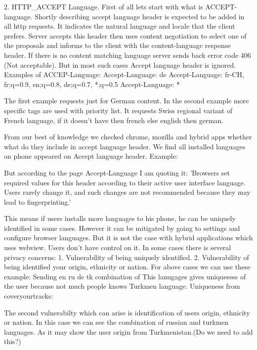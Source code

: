 2. HTTP\_ACCEPT Language.
First of all lets start with what is ACCEPT-language. 
Shortly describing accept language header is expected to be added in all http requests. It indicates the natural language and locale that the client prefers. Server accepts this header then uses content negotiation to select one of the proposals and informs to the client with the content-language response header. 
 If there is no content matching language server sends back error code 406 (Not acceptable). But in most such cases Accept language header is ignored. 
Examples of ACCEP-Language:
Accept-Language: de
Accept-Language: fr-CH, fr;q=0.9, en;q=0.8, de;q=0.7, *;q=0.5
Accept-Language: *


The first example requests just for German content. In the second example more specific   tags  are used with priority list. It requests Swiss regional variant of French language, if it doesn't have then french else  english then german. 

From our best of knowledge we checked chrome, mozilla and hybrid apps whether what do they include in accept language header. 
We find all installed languages on phone appeared on Accept language header. 
Example:

But according to the page Accept-Language I am quoting it: 
 'Browsers set required values for this header according to their active user interface language. Users rarely change it, and such changes are not recommended because they may lead to fingerprinting.'

This means if users installs more languages to his phone, he can be uniquely identified in some cases. 
However it can be mitigated by going to settings and configure browser languages. 
But it is not the case with hybrid applications which uses webview.  Users don't have control on it. 
In some cases there is several privacy concerns:
1. Vulnerability of being uniquely identified.
2. Vulnerability of being identified your origin, ethnicity or nation.
For above cases we can use these example:
Sending en  ru  de tk
combination of This lanugages gives uniquesess of the user because not much people knows Turkmen language.  Uniqueness from coveryourtracks:

The second vulnerabilty which can arise is identification of users origin, ethnicity or nation. In this case we can see the combination of russian and turkmen languages. As it may show the user origin from Turkmenistan.(Do we need to add this?) 

 
 




